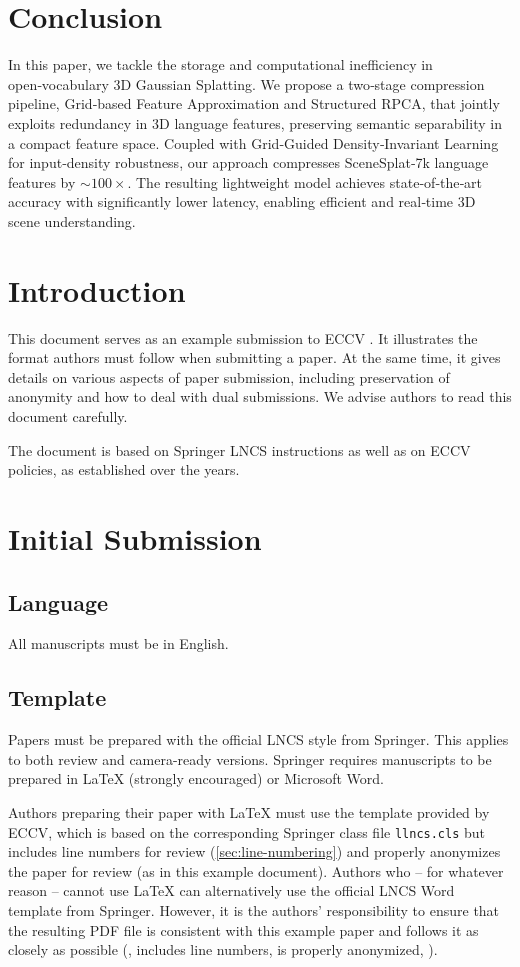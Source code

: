 \documentclass[runningheads]{llncs}
\begin{document}
\section{Conclusion}
In this paper, we tackle the storage and computational inefficiency in open‑vocabulary 3D Gaussian Splatting. We propose a two‑stage compression pipeline, Grid‑based Feature Approximation and Structured RPCA, that jointly exploits redundancy in 3D language features, preserving semantic separability in a compact feature space. Coupled with Grid‑Guided Density‑Invariant Learning for input‑density robustness, our approach compresses SceneSplat‑7k language features by $\sim100\times$. The resulting lightweight model achieves state‑of‑the‑art accuracy with significantly lower latency, enabling efficient and real‑time 3D scene understanding.

\iffalse
\section{Introduction}
\label{sec:intro}

This document serves as an example submission to ECCV \ECCVyear{}.
It illustrates the format authors must follow when submitting a paper. 
At the same time, it gives details on various aspects of paper submission, including preservation of anonymity and how to deal with dual submissions.
We advise authors to read this document carefully.

The document is based on Springer LNCS instructions as well as on ECCV policies, as established over the years.

\section{Initial Submission}

\subsection{Language}
All manuscripts must be in English.


\subsection{Template}
Papers must be prepared with the official LNCS style from Springer.
This applies to both review and camera-ready versions.
Springer requires manuscripts to be prepared in \LaTeX{} (strongly encouraged) or Microsoft Word. 

Authors preparing their paper with \LaTeX{} must use the template provided by ECCV, which is based on the corresponding Springer class file \texttt{llncs.cls} but includes line numbers for review (\cref{sec:line-numbering}) and properly anonymizes the paper for review (as in this example document).
Authors who -- for whatever reason -- cannot use \LaTeX{} can alternatively use the official LNCS Word template from Springer.
However, it is the authors' responsibility to ensure that the resulting PDF file is consistent with this example paper and follows it as closely as possible (\ie, includes line numbers, is properly anonymized, \etc).
\end{document}
